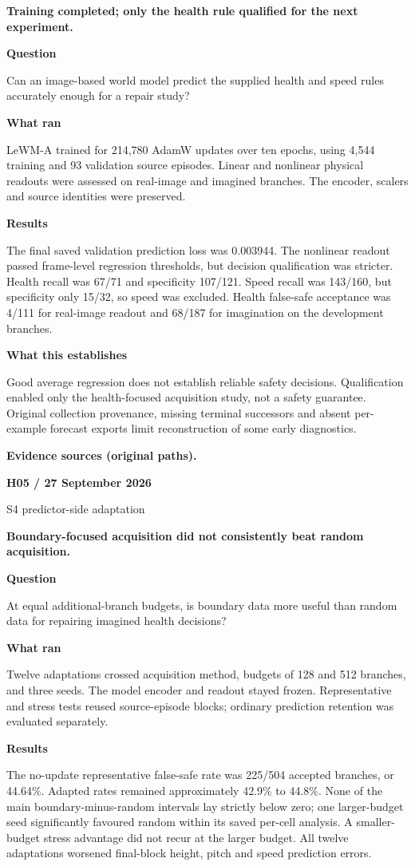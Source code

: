 \documentclass[11pt,a4paper]{article}
\newcommand{\block}[2]{\par\textbf{\color{ink}#1}\par\nopagebreak #2\par}
\newcommand{\finding}[1]{\begin{tcolorbox}[colback=pale,colframe=pale,boxrule=0pt,arc=1mm,left=10pt,right=10pt,top=10pt,bottom=10pt]\color{ink}\large\bfseries #1\end{tcolorbox}}
\begin{document}
\finding{Training completed; only the health rule qualified for the next experiment.}
\block{Question}{Can an image-based world model predict the supplied health and speed rules accurately enough for a repair study?}
\block{What ran}{LeWM-A trained for 214,780 AdamW updates over ten epochs, using 4,544 training and 93 validation source episodes. Linear and nonlinear physical readouts were assessed on real-image and imagined branches. The encoder, scalers and source identities were preserved.}
\block{Results}{The final saved validation prediction loss was 0.003944. The nonlinear readout passed frame-level regression thresholds, but decision qualification was stricter. Health recall was 67/71 and specificity 107/121. Speed recall was 143/160, but specificity only 15/32, so speed was excluded. Health false-safe acceptance was 4/111 for real-image readout and 68/187 for imagination on the development branches.}
\block{What this establishes}{Good average regression does not establish reliable safety decisions. Qualification enabled only the health-focused acquisition study, not a safety guarantee. Original collection provenance, missing terminal successors and absent per-example forecast exports limit reconstruction of some early diagnostics.}
\vfill{\footnotesize\color{muted}\textbf{Evidence sources (original paths).}\par
\raggedright {}}
\clearpage
{}\label{exp:H05}
{\color{accent}\small\bfseries H05 / 27 September 2026}\par
{}\par
{\color{muted}\small S4 predictor-side adaptation}\par\vspace{2mm}
\finding{Boundary-focused acquisition did not consistently beat random acquisition.}
\block{Question}{At equal additional-branch budgets, is boundary data more useful than random data for repairing imagined health decisions?}
\block{What ran}{Twelve adaptations crossed acquisition method, budgets of 128 and 512 branches, and three seeds. The model encoder and readout stayed frozen. Representative and stress tests reused source-episode blocks; ordinary prediction retention was evaluated separately.}
\block{Results}{The no-update representative false-safe rate was 225/504 accepted branches, or 44.64\%. Adapted rates remained approximately 42.9\% to 44.8\%. None of the main boundary-minus-random intervals lay strictly below zero; one larger-budget seed significantly favoured random within its saved per-cell analysis. A smaller-budget stress advantage did not recur at the larger budget. All twelve adaptations worsened final-block height, pitch and speed prediction errors.}
\end{document}
